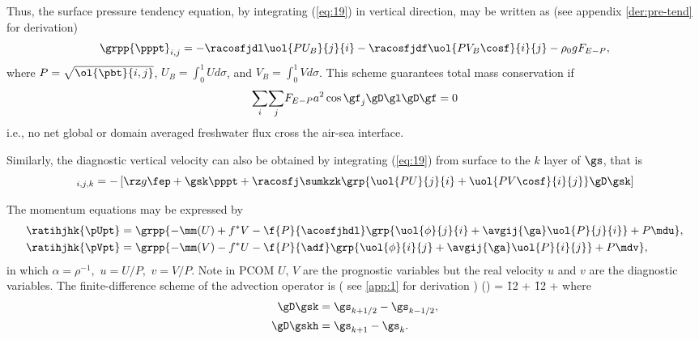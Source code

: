 Thus, the surface pressure tendency equation, by integrating (\ref{eq:19}) in vertical
direction, may be written as (see appendix \ref{der:pre-tend} for derivation)
\begin{equation}\label{eq:33}
  \grpp{\pppt}_{i,j} = -\racosfjdl \uol{PU_B}{j}{i}  -\racosfjdf \uol{PV_B\cosf}{i}{j}
  -\rho_{0}gF_{E-P},
\end{equation}
where $P=\sqrt{\ol{\pbt}{i,j}}$,  $U_{B}=\int_{0}^{1}Ud\sigma$, 
and $V_{B}=\int_{0}^{1}Vd\sigma$.
This scheme guarantees total mass conservation if
\begin{equation}
\underset{i}{\sum}\underset{j}{\sum}F_{E-P}a^{2}\cos\gf_{j}\gD\gl\gD\gf=0
\end{equation}
 i.e., no net global or domain averaged freshwater flux cross the
air-sea interface.

Similarly, the diagnostic vertical velocity can also be obtained by integrating
(\ref{eq:19}) from surface to the $k$ layer of $\gs$, that is
\begin{equation}
[\pbt\dgs]_{i,j,k} = -\left[\rz g\fep + \gsk\pppt +
\racosfj \sumkzk \grp{ \uol{PU}{j}{i} + \uol{PV\cosf}{i}{j}}\gD\gsk\right]
\end{equation}

The momentum equations may be expressed by
\bese \label{eq:34}
\begin{align} 
  \ratihjhk{\pUpt} &= \grpp{ -\mm(U) + f^{*}V -\f{P}{\acosfjhdl}\grp{ 
\uol{\phi}{j}{i} + \avgij{\ga}\uol{P}{j}{i} } + P\mdu },\label{eq:39}\\
\ratihjhk{\pVpt} &= \grpp{ -\mm(V) - f^{*}U -\f{P}{\adf} \grp{ \uol{\phi}{i}{j} +
\avgij{\ga}\uol{P}{i}{j} }+ P\mdv },\\
\end{align}
\ense
in which $\alpha=\rho^{-1},\,\,  u=U/P,\,\, v=V/P$.  Note in PCOM $U,\, V$ are
the prognostic variables but the real velocity $u$ and $v$ are the diagnostic
variables.
The finite-difference scheme of the advection operator is 
 ( see \ref{app:1} for derivation )
 \beeq \label{eq:40}
\mm(\mu) = \f{1}{2\acosfjhdl}  + \f{1}{2\acosfjhdf}  
  + \rdsk{}
\eneq
where 
\bese
\begin{align}
  \gD\gsk &=\gs_{k+1/2} - \gs_{k-1/2},\\
  \gD\gskh &=\gs_{k+1} - \gs_{k}.
\end{align}
\ense

